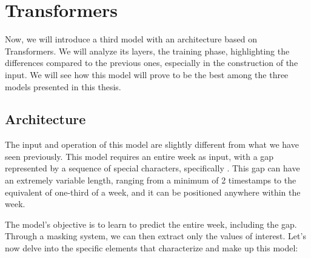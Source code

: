 \section{Transformers}\label{sec:gab}
Now, we will introduce a third model with an architecture based on Transformers\cite{attention}.
We will analyze its layers, the training phase, highlighting the differences
compared to the previous ones, especially in the construction of the input.
We will see how this model will prove to be the best among the three
models presented in this thesis.


\subsection{Architecture}
The input and operation of this model are slightly different
from what we have seen previously.
This model requires an entire week as input, with a gap represented by a
sequence of special characters, specifically .
This gap can have an extremely variable length,
ranging from a minimum of 2 timestamps to the equivalent
of one-third of a week, and it can be positioned anywhere within the week.

The model's objective is to learn to predict the entire week, including the gap.
Through a masking system, we can then extract only the values of interest.
Let's now delve into the specific elements that characterize and make up this model:


%

